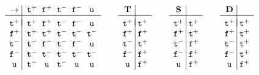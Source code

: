 \documentclass{\filespath jancl}
\newcommand{\twts}{{{\sf t}^+}}
\newcommand{\twfs}{{{\sf f}^+}}
\newcommand{\twti}{{{\sf t}^-}}
\newcommand{\twfi}{{{\sf f}^-}}
\newcommand{\twu}{{\sf u}}
\def\tf{{\bf D}}
\def\holds{{\bf T}}
\def\deft{{\bf S}}
\def\sf{\tt}
\begin{document}
\begin{definition}
\[\begin{array}{c@{\;}|@{\;\;}c@{\;\;}c@{\;\;}c@{\;\;}c@{\;\;}c}
\implies & \twts & \twfs & \twti & \twfi & \twu\\ \hline\\[-1.9ex]
\twts    & \twts & \twfs & \twti & \twfi & \twu\\
\twfs    & \twts & \twts & \twti & \twti & \twti\\
\twti    & \twti & \twfi & \twti & \twfi & \twu\\
\twfi    & \twti & \twti & \twti & \twti & \twti\\
\twu     & \twti & \twu  & \twti & \twu  & \twu
\end{array}\qquad
\begin{array}{c@{\;}|@{\;}c}
\holds & \\ \hline\\[-1.9ex]
\twts & \twts   \\
\twfs & \twfs  \\
\twti & \twts \\
\twfi & \twfs \\
\twu  & \twfs \\
\end{array}\qquad
\begin{array}{c@{\;}|@{\;}c}
\deft & \\ \hline\\[-1.9ex]
\twts  & \twts \\
\twfs  & \twts \\
\twti  & \twfs \\
\twfi  & \twfs \\
\twu   & \twfs 
\end{array}\qquad
\begin{array}{c@{\;}|@{\;}c}
\tf    & \\ \hline\\[-1.9ex]
\twts  & \twts \\
\twfs  & \twts \\
\twti  & \twts \\
\twfi  & \twts \\
\twu   & \twfs 
\end{array}\]\\[1ex]
\end{definition}
\end{document}
